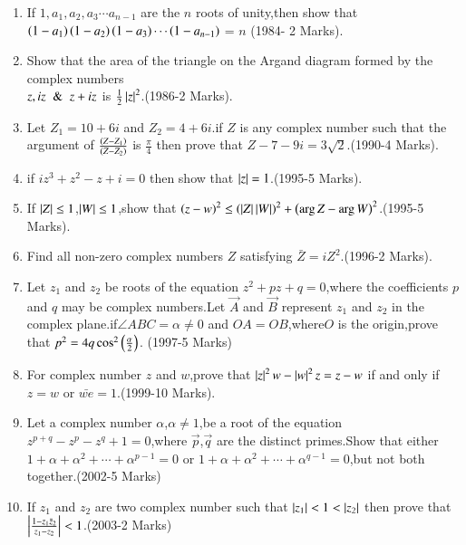 \documentclass[journal]{IEEEtran}
\begin{document}
\begin{enumerate}[start=7] %
\item If $1,a_{1},a_{2},a_{3}\cdots a_{n-1}$ are the $n$ roots of unity,then show that $\left(1-a_1\right)\left(1-a_2\right)\left(1-a_3\right)\cdots \left(1-a_{n-1}\right)$ = $n$ \hfill (1984- 2 Marks).\\
\item Show that the area of the triangle on the Argand diagram formed by the complex numbers\\
$z,iz \And z+iz$ is $\frac{1}{2}\left\vert z\right\vert^{2}$.\hfill (1986-2 Marks).\\
\item Let $Z_{1}=10+6i$ and $Z_{2}=4+6i$.if $Z$ is any complex number such that the argument of ${\frac{\left(Z-Z_1\right)}{\left(Z-Z_2\right)}}$ is ${\frac{\pi}{4}}$ then prove that $Z-7-9i=3\sqrt{2}$.\hfill(1990-4 Marks).\\
\item if {$iz^{3}+z^2-z+i=0$} then show that $\left\vert z\right\vert=1$.\hfill(1995-5 Marks).\\
\item If $\left\vert Z\right\vert\le1$,$\left\vert W\right\vert\le1$,show that $\left(z-w\right)^{2}\le\left(\left\vert Z\right\vert\left\vert W\right\vert\right)^{2}+\left(\arg Z-\arg W\right)^2$.\hfill(1995-5 Marks). \\
\item Find all non-zero complex numbers $Z$ satisfying $\bar Z=iZ^{2}$.\hfill(1996-2 Marks).\\
\item Let $z_{1}$ and $z_{2}$ be roots of the equation $z^{2}+pz+q=0$,where the coefficients $p$ and $q$ may be complex numbers.Let $\Vec{A}$ and $\Vec{B}$ represent $z_{1}$ and $z_{2}$ in the complex plane.if$\angle ABC=\alpha\not=0$ and $OA=OB$,where$O$ is the origin,prove that $p^{2}=4q\cos^{2}\left(\frac{\alpha}{2}\right)$. \hfill(1997-5 Marks)\\
\item For complex number $z$ and $w$,prove that $\left\vert z\right\vert^{2}w-\left\vert w\right\vert^{2}z=z-w$ if and only if $z=w$ or $\bar{we}=1$.\hfill(1999-10 Marks).\\
\item Let a complex number $\alpha$,$\alpha \not=1$,be a root of the equation $z^{p+q}-z^p-z^q+1=0$,where $\Vec{p}$,$\Vec{q}$ are the distinct primes.Show that either $1+\alpha+\alpha^{2}+\cdots+\alpha^{p-1}=0$ or $1+\alpha+\alpha^{2}+\cdots+\alpha^{q- 1}=0$,but not both together.\hfill(2002-5 Marks)\\
\item If $z_{1}$ and $z_{2}$ are two complex number such that $\left\vert z_{1}\right\vert<1<\left\vert z_{2}\right\vert$ then prove that  $\left\vert\frac{1-z_{1} \bar z_{2}}{z_{1}-z_{2}}\right\vert<1$.\hfill(2003-2 Marks)\\

\end{enumerate}
\end{document}
